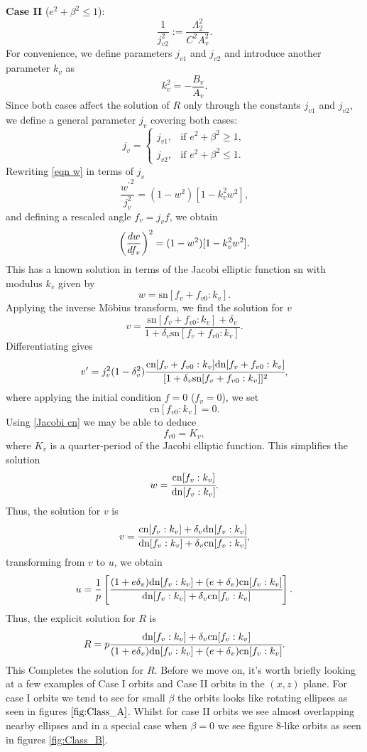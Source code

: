 \documentclass[12pt,oneside]{report}
\theoremstyle{definition}
\begin{document}
\textbf{Case II} ($e^{2}+\beta^{2} \leq 1$):
$$ \frac{1}{j_{v2}^{2}} := \frac{\Lambda_{2}^{2}}{C^{2}A_{v}^{2}}.$$ 
For convenience, we define parameters $j_{v1}$ and $j_{v2}$ and introduce another parameter $k_{v}$ as
$$ k_{v}^{2} = -\frac{B_{v}}{A_{v}}.$$ 
Since both cases affect the solution of $R$ only through the constants $j_{v1}$ and $j_{v2}$, we define a general parameter $j_{v}$ covering both cases:
\begin{equation}
  j_{v} =
    \begin{cases}
      j_{v1}, & \text{if } e^{2}+\beta^{2} \geq 1, \\
      j_{v2}, & \text{if } e^{2}+\beta^{2} \leq 1.
    \end{cases}       
\end{equation}
Rewriting \autoref{eqn w} in terms of $j_{v}$
\begin{equation}\label{4.61}
    \frac{{w^{\prime}}^{2}}{j_{v}^{2}} = (1-w^{2})[1-k_{v}^{2}w^{2}],
\end{equation}
and defining a rescaled angle $f_{v} = j_{v}f$, we obtain
$$ \left(\displaystyle\frac{d w}{d f_{v}}\right)^{2} = (1-w^{2})[1-k_{v}^{2}w^{2}].$$
This has a known solution in terms of the Jacobi elliptic function $\text{sn}$ with modulus $k_{v}$ given by
$$ w = \text{sn}[f_{v}+f_{v0}:k_{v}].$$
Applying the inverse M\"obius transform, we find the solution for $v$
$$ v = \frac{\text{sn}[f_{v}+f_{v0}:k_{v}]+\delta_{v}}{1+\delta_{v} \text{sn}[f_{v}+f_{v0}:k_{v}]}.$$
Differentiating gives
$$ v^{\prime} = j_{v}^{2}(1-\delta_{v}^{2})\cfrac{\text{cn}[f_{v}+f_{v0}:k_{v}]\text{dn}[f_{v}+f_{v0}:k_{v}]}{[1+\delta_{v}\text{sn}[f_{v}+f_{v0}:k_{v}]]^{2}},$$
where applying the initial condition $f = 0$ ($f_{v} = 0$), we set
$$ \text{cn}[f_{v0}:k_{v}] = 0.$$ 
Using \autoref{Jacobi cn} we may be able to deduce
$$ f_{v0} = K_{v},$$
where $K_{v}$ is a quarter-period of the Jacobi elliptic function. This simplifies the solution
$$ w = \cfrac{\text{cn}[f_{v}:k_{v}]}{\text{dn}[f_{v}:k_{v}]}.$$
Thus, the solution for $v$ is
$$ v = \cfrac{\text{cn}[f_{v}:k_{v}]+\delta_{v}\text{dn}[f_{v}:k_{v}]}{\text{dn}[f_{v}:k_{v}]+\delta_{v}\text{cn}[f_{v}:k_{v}]},$$
transforming from $v$ to $u$, we obtain
$$  u = \frac{1}{p} \left[\cfrac{(1+e\delta_{v})\text{dn}[f_{v}:k_{v}]+(e+\delta_{v})\text{cn}[f_{v}:k_{v}]}{\text{dn}[f_{v}:k_{v}]+\delta_{v}\text{cn}[f_{v}:k_{v}]}\right].$$
Thus, the explicit solution for $R$ is
$$ R = p \cfrac{\text{dn}[f_{v}:k_{v}]+\delta_{v}\text{cn}[f_{v}:k_{v}]}{(1+e\delta_{v})\text{dn}[f_{v}:k_{v}]+(e+\delta_{v})\text{cn}[f_{v}:k_{v}]}.$$
This Completes the solution for $R$.
Before we move on, it's worth briefly looking at a few examples of Case I orbits and Case II orbits in the \((x,z)\) plane. For case I orbits we tend to see for small $\beta$ the orbits looks like rotating ellipses as seen in figures $\ref{fig:Class_A}$. Whilst for case II orbits we see almost overlapping nearby ellipses and in a special case when $\beta = 0$ we see figure 8-like orbits as seen in figures \ref{fig:Class_B}. 
\end{document}
